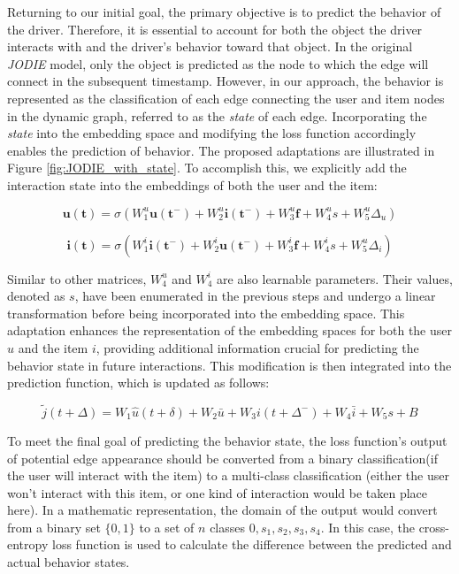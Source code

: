 Returning to our initial goal, the primary objective is to predict the behavior of the driver. Therefore, it is essential to account for both the object the driver interacts with and the driver’s behavior toward that object. In the original \textit{JODIE} model, only the object is predicted as the node to which the edge will connect in the subsequent timestamp. However, in our approach, the behavior is represented as the classification of each edge connecting the user and item nodes in the dynamic graph, referred to as the \textit{state} of each edge. Incorporating the \textit{state} into the embedding space and modifying the loss function accordingly enables the prediction of behavior. The proposed adaptations are illustrated in Figure \ref{fig:JODIE_with_state}. To accomplish this, we explicitly add the interaction state into the embeddings of both the user and the item: 


\[ \mathbf{u(t)} = \sigma (W_1^u \mathbf{u(t^-)} + W_2^u \mathbf{i(t^-)} + W_3^u \mathbf{f} + W^u_4s+W^u_5\Delta _u) \]

\[ \mathbf{i(t)} = \sigma (W_1^i \mathbf{i(t^-)} + W_2^i \mathbf{u(t^-)} + W_3^i \mathbf{f} + W^i_4s+W^u_5 \Delta _i) \]


Similar to other matrices, $W^u_4$ and $W^i_4$ are also learnable parameters. Their values, denoted as $s$, have been enumerated in the previous steps and undergo a linear transformation before being incorporated into the embedding space. This adaptation enhances the representation of the embedding spaces for both the user $u$ and the item $i$, providing additional information crucial for predicting the behavior state in future interactions. This modification is then integrated into the prediction function, which is updated as follows:

\[ \tilde{j}(t+\Delta)=W_1\hat{u}(t+\delta)+W_2\bar{u}+W_3i(t+\Delta ^-)+W_4\bar{i}+W_5s+B \]

To meet the final goal of predicting the behavior state, the loss function's output  of potential edge appearance should be converted from a binary classification(if the user will interact with the item) to a multi-class classification (either the user won't interact with this item, or one kind of interaction would be taken place here). In a mathematic representation, the domain of the output would convert from a binary set $\{0,1\}$ to a set of $n$ classes ${0,s_1,s_2,s_3,s_4}$. In this case, the cross-entropy loss function is used to calculate the difference between the predicted and actual behavior states. 



